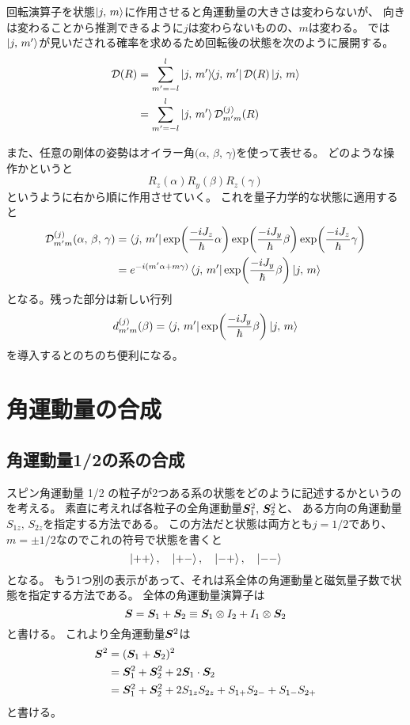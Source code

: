 \documentclass[../../master.tex]{subfiles}
\begin{document}
回転演算子を状態\(\ket{j,\, m}\)に作用させると角運動量の大きさは変わらないが、
向きは変わることから推測できるように\(j\)は変わらないものの、\(m\)は変わる。
では\(\ket{j,\,m'}\)が見いだされる確率を求めるため回転後の状態を次のように展開する。
\begin{align}
    \mathcal{D}(R) &= \sum_{m'=-l}^{l} \ketbra{j,\,m'} \mathcal{D}(R) \ket{j,\,m}\\
    &= \sum_{m'=-l}^{l} \ket{j,\,m'} \mathcal{D}_{m'm}^{(j)}(R)
\end{align}

また、任意の剛体の姿勢はオイラー角\((\alpha,\,\beta,\,\gamma\))を使って表せる。
どのような操作かというと
\begin{equation}
    R_z(\alpha)R_y(\beta)R_z(\gamma)
\end{equation}
というように右から順に作用させていく。
これを量子力学的な状態に適用すると
\begin{align}
    \mathcal{D}_{m'm}^{(j)}(\alpha,\,\beta,\,\gamma)
    &= \bra{j,\,m'}\exp(\frac{-iJ_z}{\hbar}\alpha)\exp(\frac{-iJ_y}{\hbar}\beta)\exp(\frac{-iJ_z}{\hbar}\gamma)\\
    &= e^{-i(m'\alpha+m\gamma)}\bra{j,\,m'}\exp(\frac{-iJ_y}{\hbar}\beta)\ket{j,\,m}
\end{align}
となる。残った部分は新しい行列
\begin{equation}
    d_{m'm}^{(j)}(\beta) = \bra{j,\,m'}\exp(\frac{-iJ_y}{\hbar}\beta)\ket{j,\,m}
\end{equation}
を導入するとのちのち便利になる。

\section{角運動量の合成}
\subsection{角運動量1/2の系の合成}
スピン角運動量 1/2 の粒子が2つある系の状態をどのように記述するかというのを考える。
素直に考えれば各粒子の全角運動量\(\vb*{S}_1^2,\,\vb*{S}_2^2\)と、
ある方向の角運動量\(S_{1z},\,S_{2z}\)を指定する方法である。
この方法だと状態は両方とも\(j=1/2\)であり、
\(m=\pm1/2\)なのでこれの符号で状態を書くと
\begin{equation}
    \ket{++},\quad\ket{+-},\quad\ket{-+},\quad\ket{--}
\end{equation}
となる。
もう1つ別の表示があって、それは系全体の角運動量と磁気量子数で状態を指定する方法である。
全体の角運動量演算子は
\begin{equation}
    \vb*{S} = \vb*{S}_1 + \vb*{S}_2 \equiv \vb*{S}_1 \otimes I_2 + I_1 \otimes \vb*{S}_2
\end{equation}
と書ける。
これより全角運動量\(\vb*{S}^2\)は
\begin{align}
    \vb*{S}^2
    &= (\vb*{S}_1+\vb*{S}_2)^2\\
    &= \vb*{S}_1^2 + \vb*{S}_2^2 + 2 \vb*{S}_1 \cdot \vb*{S}_2\\
    &= \vb*{S}_1^2 + \vb*{S}_2^2 + 2S_{1z}S_{2z} + S_{1+}S_{2-} + S_{1-}S_{2+}
\end{align}
と書ける。
\end{document}

